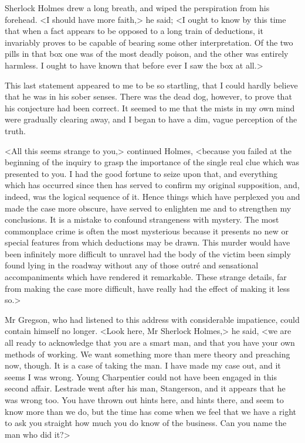 Sherlock Holmes drew a long breath, and wiped the perspiration from his forehead. <I should have more faith,> he said; <I ought to know by this time that when a fact appears to be opposed to a long train of deductions, it invariably proves to be capable of bearing some other interpretation. Of the two pills in that box one was of the most deadly poison, and the other was entirely harmless. I ought to have known that before ever I saw the box at all.>

This last statement appeared to me to be so startling, that I could hardly believe that he was in his sober senses. There was the dead dog, however, to prove that his conjecture had been correct. It seemed to me that the mists in my own mind were gradually clearing away, and I began to have a dim, vague perception of the truth.

<All this seems strange to you,> continued Holmes, <because you failed at the beginning of the inquiry to grasp the importance of the single real clue which was presented to you. I had the good fortune to seize upon that, and everything which has occurred since then has served to confirm my original supposition, and, indeed, was the logical sequence of it. Hence things which have perplexed you and made the case more obscure, have served to enlighten me and to strengthen my conclusions. It is a mistake to confound strangeness with mystery. The most commonplace crime is often the most mysterious because it presents no new or special features from which deductions may be drawn. This murder would have been infinitely more difficult to unravel had the body of the victim been simply found lying in the roadway without any of those outré and sensational accompaniments which have rendered it remarkable. These strange details, far from making the case more difficult, have really had the effect of making it less so.>

Mr Gregson, who had listened to this address with considerable impatience, could contain himself no longer. <Look here, Mr Sherlock Holmes,> he said, <we are all ready to acknowledge that you are a smart man, and that you have your own methods of working. We want something more than mere theory and preaching now, though. It is a case of taking the man. I have made my case out, and it seems I was wrong. Young Charpentier could not have been engaged in this second affair. Lestrade went after his man, Stangerson, and it appears that he was wrong too. You have thrown out hints here, and hints there, and seem to know more than we do, but the time has come when we feel that we have a right to ask you straight how much you do know of the business. Can you name the man who did it?>

